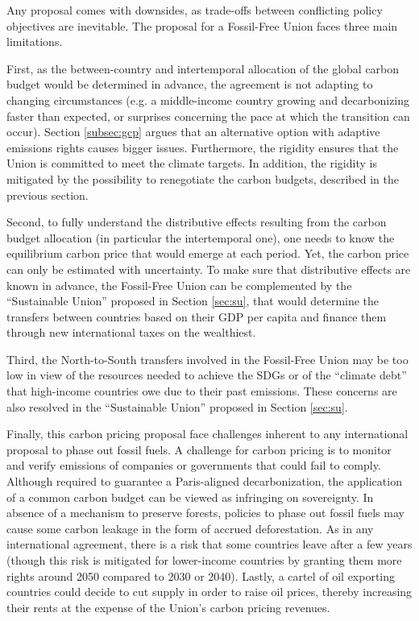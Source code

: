 \documentclass[12pt,english]{article}
\begin{document}
Any proposal comes with downsides, as trade-offs between conflicting policy objectives are inevitable. The proposal for a Fossil-Free Union faces three main limitations. 

First, as the between-country and intertemporal allocation of the global carbon budget would be determined in advance, the agreement is not adapting to changing circumstances (e.g. a middle-income country growing and decarbonizing faster than expected, or surprises concerning the pace at which the transition can occur). Section \ref{subsec:gcp} argues that an alternative option with adaptive emissions rights causes bigger issues. Furthermore, the rigidity ensures that the Union is committed to meet the climate targets. In addition, the rigidity is mitigated by the possibility to renegotiate the carbon budgets, described in the previous section. 

Second, to fully understand the distributive effects resulting from the carbon budget allocation (in particular the intertemporal one), one needs to know the equilibrium carbon price that would emerge at each period. Yet, the carbon price can only be estimated with uncertainty. To make sure that distributive effects are known in advance, the Fossil-Free Union can be complemented by the ``Sustainable Union'' proposed in Section \ref{sec:su}, that would determine the transfers between countries based on their GDP per capita and finance them through new international taxes on the wealthiest.

Third, the North-to-South transfers involved in the Fossil-Free Union may be too low in view of the resources needed to achieve the SDGs or of the ``climate debt'' that high-income countries owe due to their past emissions. These concerns are also resolved in the ``Sustainable Union'' proposed in Section \ref{sec:su}.

Finally, this carbon pricing proposal face challenges inherent to any international proposal to phase out fossil fuels. A challenge for carbon pricing is to monitor and verify emissions of companies or governments that could fail to comply. Although required to guarantee a Paris-aligned decarbonization, the application of a common carbon budget can be viewed as infringing on sovereignty. In absence of a mechanism to preserve forests, policies to phase out fossil fuels may cause some carbon leakage in the form of accrued deforestation. As in any international agreement, there is a risk that some countries leave after a few years (though this risk is mitigated for lower-income countries by granting them more rights around 2050 compared to 2030 or 2040). Lastly, a cartel of oil exporting countries could decide to cut supply in order to raise oil prices, thereby increasing their rents at the expense of the Union's carbon pricing revenues. %
\end{document}
